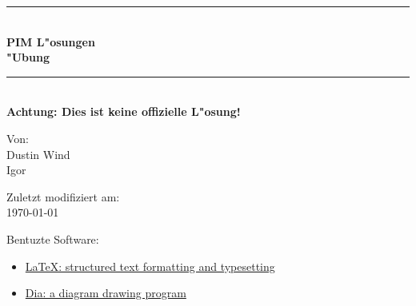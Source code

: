 \documentclass[11pt,oneside,a4wide]{report}
\newcommand{\HRule}{\rule{\linewidth}{0.5mm}}
\begin{document}
\begin{titlepage}
    \begin{center}

    \HRule \\[0.4cm]
    { \huge \bfseries PIM L"osungen\\"Ubung\\[0.4cm] }
    \HRule \\[1.5cm]

    \textbf{Achtung: Dies ist keine offizielle L"osung!}

    \vfill
    Von:\\
    Dustin Wind\\
    Igor


   \vfill
    Zuletzt modifiziert am:\\
    {\large \today}\\
    \end{center}
    \bigskip

    {\small
    Bentuzte Software:
    \begin{itemize}
        \item \href{http://www.latex-project.org}{\LaTeX{}: structured text formatting and typesetting}
        \item \href{https://wiki.gnome.org/Apps/Dia/}{Dia: a diagram drawing program}
    \end{itemize}
    }

\end{titlepage}


\tableofcontents

%






\end{document}
